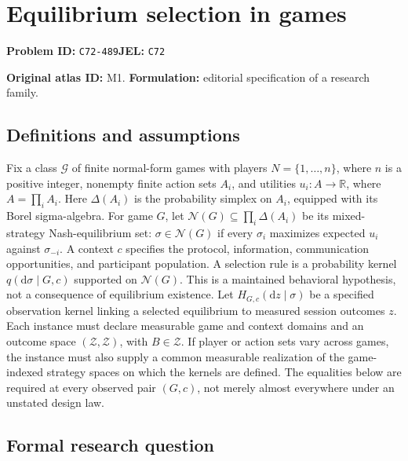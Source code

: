 \documentclass[11pt,a4paper]{article}
\begin{document}
\section*{Equilibrium selection in games}
\textbf{Problem ID:} \texttt{C72-489}\quad \textbf{JEL:} \texttt{C72}\par
\label{problem:OP-0001}
\label{atlas:prob:M1}

\noindent\textbf{Original atlas ID:} M1. \textbf{Formulation:} editorial specification of a research family.

\subsection*{Definitions and assumptions}

Fix a class $\mathcal G$ of finite normal-form games with players $N=\{1,\ldots,n\}$, where $n$ is a positive integer, nonempty finite action sets $A_i$, and utilities $u_i:A\to\mathbb R$, where $A=\prod_iA_i$. Here $\Delta(A_i)$ is the probability simplex on $A_i$, equipped with its Borel sigma-algebra. For game $G$, let $\mathcal N(G)\subseteq\prod_i\Delta(A_i)$ be its mixed-strategy Nash-equilibrium set: $\sigma\in\mathcal N(G)$ if every $\sigma_i$ maximizes expected $u_i$ against $\sigma_{-i}$. A context $c$ specifies the protocol, information, communication opportunities, and participant population. A selection rule is a probability kernel $q(\mathrm d\sigma\mid G,c)$ supported on $\mathcal N(G)$. This is a maintained behavioral hypothesis, not a consequence of equilibrium existence. Let $H_{G,c}(\mathrm dz\mid\sigma)$ be a specified observation kernel linking a selected equilibrium to measured session outcomes $z$. Each instance must declare measurable game and context domains and an outcome space $(\mathcal Z,\mathscr Z)$, with $B\in\mathscr Z$. If player or action sets vary across games, the instance must also supply a common measurable realization of the game-indexed strategy spaces on which the kernels are defined. The equalities below are required at every observed pair $(G,c)$, not merely almost everywhere under an unstated design law.

\subsection*{Formal research question}
\end{document}
